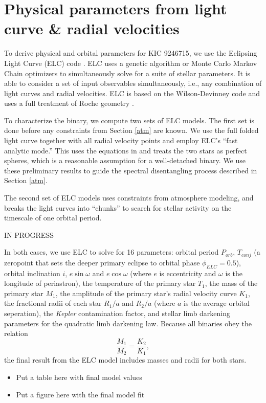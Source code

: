 \section{Physical parameters from light curve \& radial velocities}\label{model}
To derive physical and orbital parameters for KIC 9246715, we use the Eclipsing Light Curve (ELC) code \citep{oro00}. ELC uses a genetic algorithm or Monte Carlo Markov Chain optimizers to simultaneously solve for a suite of stellar parameters. It is able to consider a set of input observables simultaneously, i.e., any combination of light curves and radial velocities. ELC is based on the Wilson-Devinney code \citep{wil71} and uses a full treatment of Roche geometry \citep{avn75}.

To characterize the binary, we compute two sets of ELC models. The first set is done before any constraints from Section \ref{atm} are known. We use the full folded light curve together with all radial velocity points and employ ELC's ``fast analytic mode.'' This uses the equations in \citep{gim06} and treats the two stars as perfect spheres, which is a reasonable assumption for a well-detached binary. We use these preliminary results to guide the spectral disentangling process described in Section \ref{atm}.

The second set of ELC models uses constraints from atmosphere modeling, and breaks the light curves into ``chunks'' to search for stellar activity on the timescale of one orbital period.

IN PROGRESS

In both cases, we use ELC to solve for 16 parameters: orbital period $P_{orb}$, $T_{conj}$ (a zeropoint that sets the deeper primary eclipse to orbital phase $\phi_{ELC} = 0.5$), orbital inclination $i$, $e \sin \omega$ and $e \cos \omega$ (where $e$ is eccentricity and $\omega$ is the longitude of periastron), the temperature of the primary star $T_1$, the mass of the primary star $M_1$, the amplitude of the primary star's radial velocity curve $K_1$, the fractional radii of each star $R_1/a$ and $R_2/a$ (where $a$ is the average orbital seperation), the \emph{Kepler} contamination factor, and stellar limb darkening parameters for the quadratic limb darkening law. Because all binaries obey the relation
\begin{equation}
\frac{M_1}{M_2} = \frac{K_2}{K_1},
\end{equation}
the final result from the ELC model includes masses and radii for both stars.

\begin{itemize}
\item Put a table here with final model values
\item Put a figure here with the final model fit
\end{itemize}

